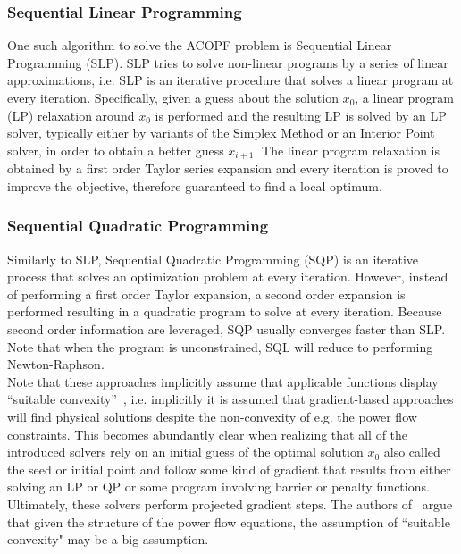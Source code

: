 \documentclass[11pt]{cmuthesis} %
\begin{document}
\subsubsection{Sequential Linear Programming}
One such algorithm to solve the ACOPF problem is Sequential Linear Programming (SLP). SLP tries to solve non-linear programs by a series of linear approximations, i.e. SLP is an iterative procedure that solves a linear program at every iteration. Specifically, given a guess about the solution $x_0$, a linear program (LP) relaxation around $x_0$ is performed and the resulting LP is solved by an LP solver, typically either by variants of the Simplex Method or an Interior Point solver, in order to obtain a better guess $x_{i+1}$. The linear program relaxation is obtained by a first order Taylor series expansion and every iteration is proved to improve the objective, therefore guaranteed to find a local optimum.

\subsubsection{Sequential Quadratic Programming}
Similarly to SLP, Sequential Quadratic Programming (SQP) is an iterative process that solves an optimization problem at every iteration. However, instead of performing a first order Taylor expansion, a second order expansion is performed resulting in a quadratic program to solve at every iteration. Because second order information are leveraged, SQP usually converges faster than SLP. Note that when the program is unconstrained, SQL will reduce to performing Newton-Raphson.\\

Note that these approaches implicitly assume that applicable functions display “suitable convexity”~\cite{carpentier1962contribution}, i.e. implicitly it is assumed that gradient-based approaches will find physical solutions despite the non-convexity of e.g. the power flow constraints. This becomes abundantly clear when realizing that all of the introduced solvers rely on an initial guess of the optimal solution $x_0$ also called the seed or initial point and follow some kind of gradient that results from either solving an LP or QP or some program involving barrier or penalty functions. Ultimately, these solvers perform projected gradient steps. The authors of~\cite{hiskens2001exploring,schecter2013exploration} argue that given the structure of the power flow equations, the assumption of ``suitable convexity" may be a big assumption.\\
\end{document}

